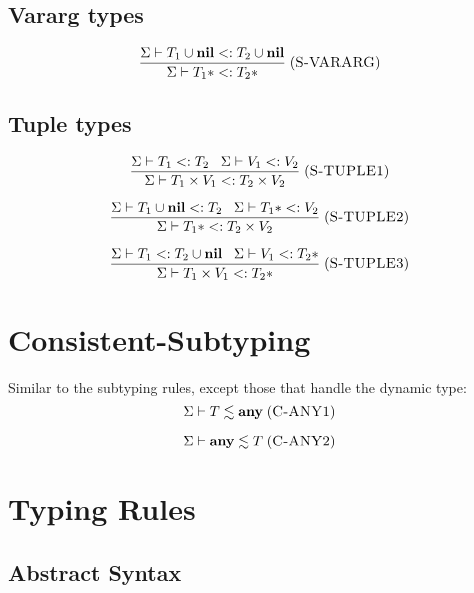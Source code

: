 \documentclass[12pt]{article}
\newcommand{\Any}{\mathbf{any}}
\newcommand{\Nil}{\mathbf{nil}}
\newcommand{\mylabel}[1]{\; (\textsc{#1})}
\newcommand{\subtype}{<:}
\newcommand{\senv}{\Sigma}
\begin{document}
\subsection{Vararg types}

\[
\frac{\senv \vdash T_{1} \cup \Nil \subtype T_{2} \cup \Nil}
     {\senv \vdash T_{1}* \subtype T_{2}*}
\mylabel{S-VARARG}
\]

\subsection{Tuple types}

\[
\frac{\senv \vdash T_{1} \subtype T_{2} \;\;\;
      \senv \vdash V_{1} \subtype V_{2}}
     {\senv \vdash T_{1} \times V_{1} \subtype T_{2} \times V_{2}}
\mylabel{S-TUPLE1}
\]

\[
\frac{\senv \vdash T_{1} \cup \Nil \subtype T_{2} \;\;\;
      \senv \vdash T_{1}* \subtype V_{2}}
     {\senv \vdash T_{1}* \subtype T_{2} \times V_{2}}
\mylabel{S-TUPLE2}
\]

\[
\frac{\senv \vdash T_{1} \subtype T_{2} \cup \Nil \;\;\;
      \senv \vdash V_{1} \subtype T_{2}*}
     {\senv \vdash T_{1} \times V_{1} \subtype T_{2}*}
\mylabel{S-TUPLE3}
\]

\section{Consistent-Subtyping}

Similar to the subtyping rules, except those that handle the dynamic type:
\[
\senv \vdash T \lesssim \Any
\mylabel{C-ANY1}
\]

\[
\senv \vdash \Any \lesssim T
\mylabel{C-ANY2}
\]

\section{Typing Rules}

\subsection{Abstract Syntax}
\end{document}
